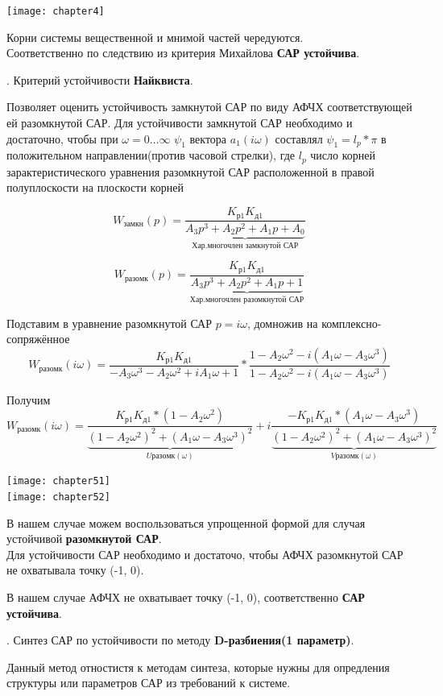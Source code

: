 \documentclass[12pt, a4paper]{report}
\begin{document}
\texttt{[image: chapter4]}

Корни системы вещественной и мнимой частей чередуются.\\
Соответственно по следствию из критерия Михайлова \textbf{САР устойчива}.

. Критерий устойчивости \textbf{Найквиста}.

Позволяет оценить устойчивость замкнутой САР по виду АФЧХ соответствующей ей разомкнутой САР.
Для устойчивости замкнутой САР необходимо и достаточно, чтобы при $ \omega=0\ldots\infty $ $ \psi_1 $ вектора $ a_{1}(i\omega) $ составлял $ \psi_{1} = l_{p} * \pi $ в положительном направлении(против часовой стрелки), где $ l_{p} $ число корней зарактеристического уравнения разомкнутой САР расположенной в правой полуплоскости на плоскости корней

$$ W_{замкн}(p) = \frac{K_{р1}K_{д1}}{\underbrace{A_{3}p^{3} + A_{2}p^{2} + A_{1}p + A_{0}}_{\text{Хар.многочлен замкнутой САР}}} $$

$$ W_{разомк}(p) = \frac{K_{р1}K_{д1}}{\underbrace{A_{3}p^{3} + A_{2}p^{2} + A_{1}p + 1}_{\text{Хар.многочлен разомкнутой САР}}} $$

Подставим в уравнение разомкнутой САР $ p = i\omega $, домножив на комплексно-сопряжённое
$$ W_{разомк}(i\omega) = \frac{K_{р1}K_{д1}}{-A_{3}\omega^{3} - A_{2}\omega^{2} + iA_{1}\omega + 1}*
    \frac{1-A_{2}\omega^{2}-i(A_{1}\omega-A_{3}\omega^{3})}{1-A_{2}\omega^{2}-i(A_{1}\omega-A_{3}\omega^{3})} $$

Получим
$$ W_{разомк}(i\omega) = \frac{K_{р1}K_{д1}*(1-A_{2}\omega^{2})} {\underbrace{(1-A_{2}\omega^{2})^{2}+(A_{1}\omega-A_{3}\omega^{3})^{2}}_{Uразомк(\omega)}} +
    i\frac{-K_{р1}K_{д1}*(A_{1}\omega-A_{3}\omega^{3})} {\underbrace{(1-A_{2}\omega^{2})^{2}+(A_{1}\omega-A_{3}\omega^{3})^{2}}_{Vразомк(\omega)}} $$

\texttt{[image: chapter51]}\\
\texttt{[image: chapter52]}

В нашем случае можем воспользоваться упрощенной формой для случая устойчивой \textbf{разомкнутой САР}. \\
Для устойчивости САР необходимо и достаточо, чтобы АФЧХ разомкнутой САР не охватывала точку (-1, 0).

В нашем случае АФЧХ не охватывает точку (-1, 0), соответственно \textbf{САР устойчива}.

. Синтез САР по устойчивости по методу \textbf{D-разбиения(1 параметр)}.

Данный метод отностистя к методам синтеза, которые нужны для опредления структуры или параметров САР из требований к системе.
\end{document}
